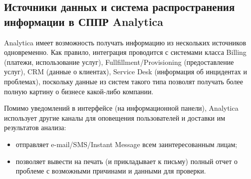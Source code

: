 \subsection{Источники данных и система распространения информации в СППР Analytica}

Analytica имеет возможность получать информацию из нескольких источников
одновременно. Как правило, интеграция проводится с системами класса Billing
(платежи, использование услуг), Fullfillment/Provisioning (предоставление услуг),
CRM (данные о клиентах), Service Desk (информация об инцидентах и проблемах),
поскольку данные из систем такого типа позволят получать более полную картину
о бизнесе какой-либо компании.

Помимо уведомлений в интерфейсе (на информационной панели), Analytica использует
другие каналы для оповещения пользователей и доставки им результатов анализа:
\begin{itemize}
  \item отправляет e-mail/SMS/Instant Message всем заинтересованным лицам;
  \item позволяет вывести на печать (и прикладывает к письму) полный отчет
    о проблеме с возможными причинами и данными для проверки.
\end{itemize}

\pagebreak

